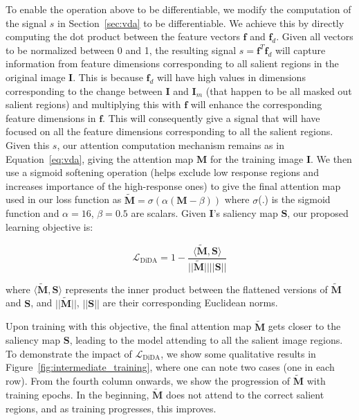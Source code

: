 \documentclass[10pt,twocolumn,letterpaper]{article}
\begin{document}
To enable the operation above to be differentiable, we modify the computation of the signal $s$ in Section~\ref{sec:vda} to be differentiable. We achieve this by directly computing the dot product between the feature vectors $\textbf{f}$ and $\textbf{f}_{d}$. Given all vectors to be normalized between 0 and 1, the resulting signal $s=\textbf{f}^{T}\textbf{f}_{d}$ will capture information from feature dimensions corresponding to all salient regions in the original image $\textbf{I}$. This is because $\textbf{f}_{d}$ will have high values in dimensions corresponding to the change between $\textbf{I}$ and $\textbf{I}_{m}$ (that happen to be all masked out salient regions) and multiplying this with $\textbf{f}$ will enhance the corresponding feature dimensions in $\textbf{f}$. This will consequently give a signal that will have focused on all the feature dimensions corresponding to all the salient regions. Given this $s$, our attention computation mechanism remains as in Equation~\ref{eq:vda}, giving the attention map $\textbf{M}$ for the training image $\textbf{I}$. We then use a sigmoid softening operation (helps exclude low response regions and increases importance of the high-response ones) to give the final attention map used in our loss function as $\widetilde{\textbf{M}}=\sigma(\alpha(\textbf{M}-\beta))$ where $\sigma$(.) is the sigmoid function and $\alpha = 16$,  $\beta = 0.5$ are scalars. 
Given $\textbf{I}$'s saliency map $\textbf{S}$, our proposed learning objective is:


\begin{equation}
    \mathcal{L}_\text{DiDA} = 1 - \dfrac{\langle\widetilde{\textbf{M}} , \textbf{S}\rangle}{||\widetilde{\textbf{M}}||||\textbf{S}||}
    \label{eq:dida}
\end{equation}
\vspace{-10pt}

where $\langle\widetilde{\textbf{M}} , \textbf{S}\rangle$ represents the inner product between the flattened versions of $\widetilde{\textbf{M}}$ and $\textbf{S}$, and $||\widetilde{\textbf{M}}||$, $||\textbf{S}||$ are their corresponding Euclidean norms.  

Upon training with this objective, the final attention map $\widetilde{\textbf{M}}$ gets closer to the saliency map $\textbf{S}$, leading to the model attending to all the salient image regions. To demonstrate the impact of $\mathcal{L}_\text{DiDA}$, we show some qualitative results in Figure~\ref{fig:intermediate_training}, where one can note two cases (one in each row). From the fourth column onwards, we show the progression of $\widetilde{\textbf{M}}$ with training epochs. In the beginning, $\widetilde{\textbf{M}}$ does not attend to the correct salient regions, and as training progresses, this improves.  
\end{document}
